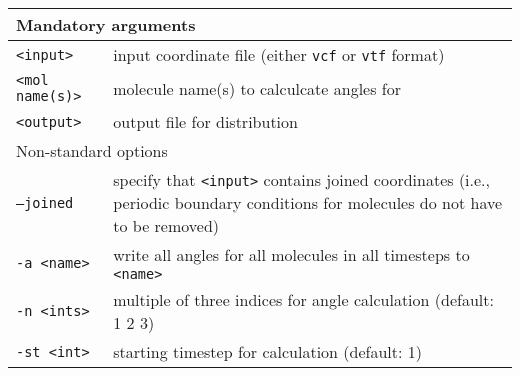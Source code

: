 \noindent
\begin{longtable}{p{}p{}}
  \toprule
  \multicolumn{2}{l}{Mandatory arguments} \\
  \midrule
  \texttt{<input>} & input coordinate file (either \texttt{vcf} or
    \texttt{vtf} format) \\
  \texttt{<mol name(s)>} & molecule name(s) to calculcate angles for \\
  \texttt{<output>} & output file for distribution \\
  \toprule
  \multicolumn{2}{l}{Non-standard options} \\
  \midrule
  \texttt{--joined} & specify that \texttt{<input>} contains joined
    coordinates (i.e., periodic boundary conditions for molecules do not
    have to be removed) \\
  \texttt{-a <name>} & write all angles for all molecules in all timesteps
    to \texttt{<name>} \\
  \texttt{-n  <ints>} & multiple of three indices for angle calculation (default: 1 2 3) \\
  \texttt{-st <int>} & starting timestep for calculation (default: 1) \\
  \bottomrule
\end{longtable}

